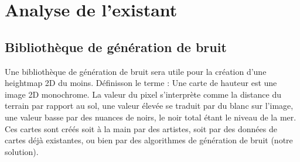 \documentclass[12pt]{report}
\begin{document}
\newpage

\chapter{Analyse de l'existant}

\section{Bibliothèque de génération de bruit}

Une bibliothèque de génération de bruit sera utile pour la création d'une heightmap 2D du moins. Définisson le terme : Une carte de hauteur est une image 2D monochrome. La valeur du pixel s'interprète comme la distance du terrain par rapport au sol, une valeur élevée se traduit par du blanc sur l'image, une valeur basse par des nuances de noirs, le noir total étant le niveau de la mer. Ces cartes sont créés soit à la main par des artistes, soit par des données de cartes déjà existantes, ou bien par des algorithmes de génération de bruit (notre solution).
\end{document}
